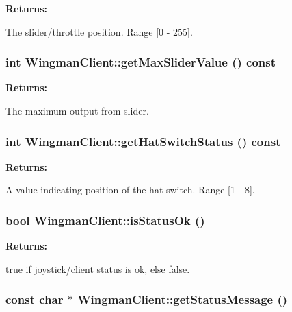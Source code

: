 \begin{Desc}
\item[{\bf Returns: }]\par
 The slider/throttle position. Range \mbox{[}0 - 255\mbox{]}. \end{Desc}
\hypertarget{class_WingmanClient_a12}{
\subsubsection[getMaxSliderValue]{\setlength{\rightskip}{0pt plus 5cm}int Wingman\-Client::get\-Max\-Slider\-Value () const}}
\label{class_WingmanClient_a12}


\begin{Desc}
\item[{\bf Returns: }]\par
 The maximum output from slider. \end{Desc}
\hypertarget{class_WingmanClient_a13}{
\subsubsection[getHatSwitchStatus]{\setlength{\rightskip}{0pt plus 5cm}int Wingman\-Client::get\-Hat\-Switch\-Status () const}}
\label{class_WingmanClient_a13}


\begin{Desc}
\item[{\bf Returns: }]\par
 A value indicating position of the hat switch. Range \mbox{[}1 - 8\mbox{]}. \end{Desc}
\hypertarget{class_WingmanClient_a14}{
\subsubsection[isStatusOk]{\setlength{\rightskip}{0pt plus 5cm}bool Wingman\-Client::is\-Status\-Ok ()}}
\label{class_WingmanClient_a14}


\begin{Desc}
\item[{\bf Returns: }]\par
 true if joystick/client status is ok, else false. \end{Desc}
\hypertarget{class_WingmanClient_a15}{
\subsubsection[getStatusMessage]{\setlength{\rightskip}{0pt plus 5cm}const char $\ast$ Wingman\-Client::get\-Status\-Message ()}}
\label{class_WingmanClient_a15}


